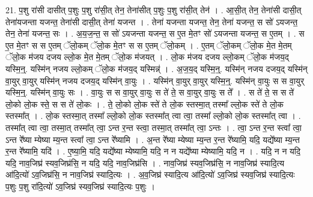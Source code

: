 \documentclass[17pt]{extarticle}
\begin{document}
21. प॒शु रा॑सी दासीत् प॒शुः प॒शु रा॑सी॒त् तेन॒ तेना॑सीत् प॒शुः प॒शु रा॑सी॒त् तेन॑ । . आ॒सी॒त् तेन॒ तेना॑सी दासी॒त् तेना॑यजन्ता यजन्त॒ तेना॑सी दासी॒त् तेना॑ यजन्त । . तेना॑ यजन्ता यजन्त॒ तेन॒ तेना॑ यजन्त॒ स सो॑ ऽयजन्त॒ तेन॒ तेना॑ यजन्त॒ सः । . अ॒य॒ज॒न्त॒ स सो॑ ऽयजन्ता यजन्त॒ स ए॒त मे॒तꣳ सो॑ ऽयजन्ता यजन्त॒ स ए॒तम् । . स ए॒त मे॒तꣳ स स ए॒तम् ॅलो॒कम् ॅलो॒क मे॒तꣳ स स ए॒तम् ॅलो॒कम् । . ए॒तम् ॅलो॒कम् ॅलो॒क मे॒त मे॒तम् ॅलो॒क म॑जय दजय ल्लो॒क मे॒त मे॒तम् ॅलो॒क म॑जयत् । . लो॒क म॑जय दजय ल्लो॒कम् ॅलो॒क म॑जय॒द् यस्मि॒न्॒. यस्मि॑न् नजय ल्लो॒कम् ॅलो॒क म॑जय॒द् यस्मिन्न्॑ । . अ॒ज॒य॒द् यस्मि॒न्॒. यस्मि॑न् नजय दजय॒द् यस्मि॑न् वा॒युर् वा॒युर् यस्मि॑न् नजय दजय॒द् यस्मि॑न् वा॒युः । . यस्मि॑न् वा॒युर् वा॒युर् यस्मि॒न्॒. यस्मि॑न् वा॒युः स स वा॒युर् यस्मि॒न्॒. यस्मि॑न् वा॒युः सः । . वा॒युः स स वा॒युर् वा॒युः स ते॑ ते॒ स वा॒युर् वा॒युः स ते᳚ । . स ते॑ ते॒ स स ते॑ लो॒को लो॒क स्ते॒ स स ते॑ लो॒कः । . ते॒ लो॒को लो॒क स्ते॑ ते लो॒क स्तस्मा॒त् तस्मा᳚ ल्लो॒क स्ते॑ ते लो॒क स्तस्मा᳚त् । . लो॒क स्तस्मा॒त् तस्मा᳚ ल्लो॒को लो॒क स्तस्मा᳚त् त्वा त्वा॒ तस्मा᳚ ल्लो॒को लो॒क स्तस्मा᳚त् त्वा । . तस्मा᳚त् त्वा त्वा॒ तस्मा॒त् तस्मा᳚त् त्वा॒ ऽन्त र॒न्त स्त्वा॒ तस्मा॒त् तस्मा᳚त् त्वा॒ ऽन्तः । . त्वा॒ ऽन्त र॒न्त स्त्वा᳚ त्वा॒ ऽन्त रे᳚ष्या म्येष्या म्य॒न्त स्त्वा᳚ त्वा॒ ऽन्त रे᳚ष्यामि । . अ॒न्त रे᳚ष्या म्येष्या म्य॒न्त र॒न्त रे᳚ष्यामि॒ यदि॒ यद्ये᳚ष्या म्य॒न्त र॒न्त रे᳚ष्यामि॒ यदि॑ । . ए॒ष्या॒मि॒ यदि॒ यद्ये᳚ष्या म्येष्यामि॒ यदि॒ न न यद्ये᳚ष्या म्येष्यामि॒ यदि॒ न । . यदि॒ न न यदि॒ यदि॒ नाव॒जिघ्र॑ स्यव॒जिघ्र॑सि॒ न यदि॒ यदि॒ नाव॒जिघ्र॑सि । . नाव॒जिघ्र॑ स्यव॒जिघ्र॑सि॒ न नाव॒जिघ्र॑ स्यादि॒त्य आ॑दि॒त्यो॑ ऽव॒जिघ्र॑सि॒ न नाव॒जिघ्र॑ स्यादि॒त्यः । . अ॒व॒जिघ्र॑ स्यादि॒त्य आ॑दि॒त्यो॑ ऽव॒जिघ्र॑ स्यव॒जिघ्र॑ स्यादि॒त्यः प॒शुः प॒शु रा॑दि॒त्यो॑ ऽव॒जिघ्र॑ स्यव॒जिघ्र॑ स्यादि॒त्यः प॒शुः । \newline
\end{document}
